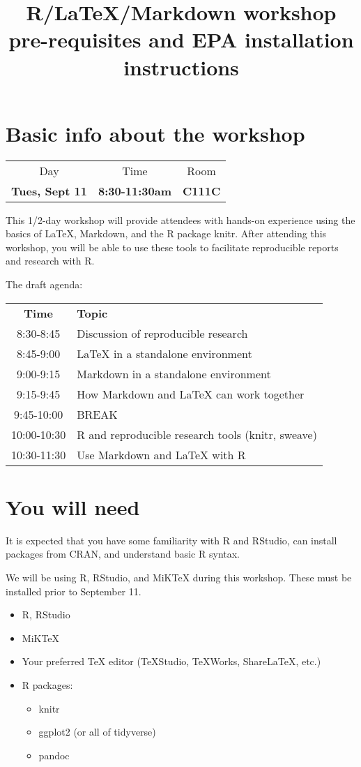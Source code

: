 \documentclass{article}
\title{R/LaTeX/Markdown workshop pre-requisites and EPA installation instructions}
\author{}
\date{}
\begin{document}
\maketitle
\tableofcontents

\section{Basic info about the workshop}
\begin{center}
    \begin{tabular}{c c c}
    Day & Time & Room \\
    \textbf{Tues, Sept 11} & \textbf{8:30-11:30am} & \textbf{C111C}
\end{tabular}
\end{center}

This 1/2-day workshop will provide attendees with hands-on experience using the basics of LaTeX, Markdown, and the R package knitr. After attending this workshop, you will be able to use these tools to facilitate reproducible reports and research with R.

The draft agenda:

\begin{tabular}{c|l}
    \textbf{Time} & \textbf{Topic} \\
    8:30-8:45 & Discussion of reproducible research \\
    8:45-9:00 & LaTeX in a standalone environment \\
    9:00-9:15 & Markdown in a standalone environment \\
    9:15-9:45 & How Markdown and LaTeX can work together \\
    9:45-10:00 & BREAK \\
    10:00-10:30 & R and reproducible research tools (knitr, sweave) \\
    10:30-11:30 & Use Markdown and LaTeX with R
\end{tabular}

\section{You will need}
It is expected that you have some familiarity with R and RStudio, can install packages from CRAN, and understand basic R syntax.

We will be using R, RStudio, and MiKTeX during this workshop. These must be installed prior to September 11.
\begin{itemize}
    \item R, RStudio
    \item MiKTeX
    \item Your preferred TeX editor (TeXStudio, TeXWorks, ShareLaTeX, etc.)
    \item R packages:
    \begin{itemize}
        \item knitr
        \item ggplot2 (or all of tidyverse)
        \item pandoc
    \end{itemize}
\end{itemize}
\end{document}
